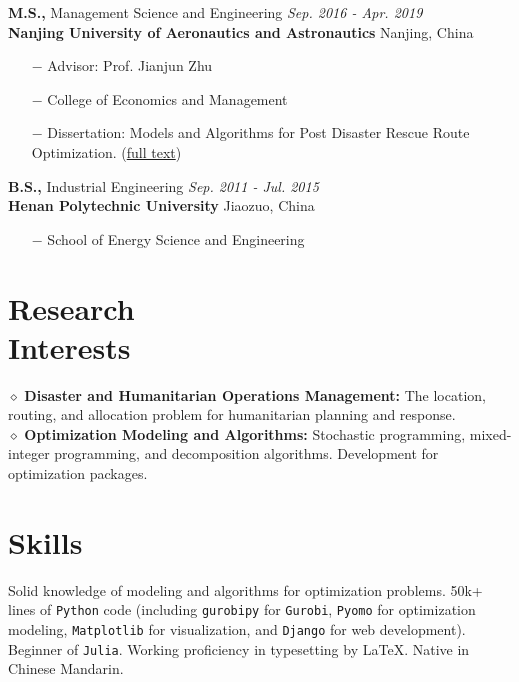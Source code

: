 \documentclass[margin]{res}
\begin{document}
\begin{resume}
{\bf M.S.,}  Management Science and Engineering \hfill {\it Sep. 2016 - Apr. 2019}\\
{\bf Nanjing University of Aeronautics and Astronautics} \hfill Nanjing, China
\begin{itemize}  \itemsep -2pt  %
\item[\(-\)] Advisor: Prof. Jianjun Zhu
\item[\(-\)] College of Economics and Management
\item[\(-\)] Dissertation: Models and Algorithms for Post Disaster Rescue Route Optimization. (\href{https://docs.google.com/viewer?url=https://github.com/phguo/phguo.github.io/raw/master/full_text/zh-MasterThesis.pdf}{full text})
\end{itemize}
\vspace{-.8em}

{\bf B.S.,}  Industrial Engineering \hfill {\it Sep. 2011 - Jul. 2015} \\
{\bf Henan Polytechnic University} \hfill Jiaozuo, China
\begin{itemize}   \itemsep -2pt  %
\item[\(-\)] School of Energy Science and Engineering
\end{itemize}


\vspace{-.8em}
\section{\sc Research \\Interests}


$\diamond$ {\bf Disaster and Humanitarian Operations Management:} The location, routing, and allocation problem for humanitarian planning and response. \\
$\diamond$ {\bf Optimization Modeling and Algorithms:} Stochastic programming, mixed-integer programming, and decomposition algorithms. Development for optimization packages.


\vspace{-.8em}
\section{\sc Skills}


Solid knowledge of modeling and algorithms for optimization problems. 
50k+ lines of \texttt{Python} code (including \texttt{gurobipy} for \texttt{Gurobi}, \texttt{Pyomo} for optimization modeling, \texttt{Matplotlib} for visualization, and \texttt{Django} for web development). 
Beginner of \texttt{Julia}.
Working proficiency in typesetting by \LaTeX. Native in Chinese Mandarin.



\end{resume}
\end{document}
